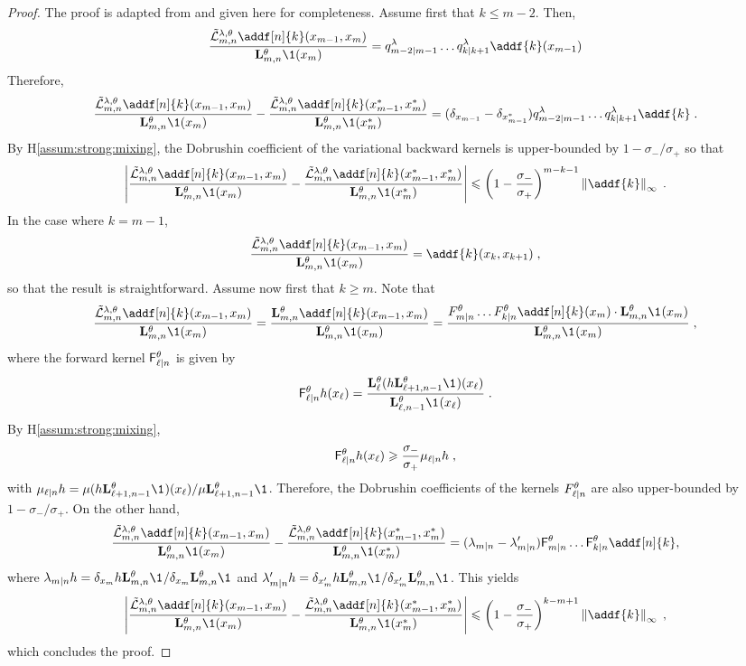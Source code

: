 \documentclass{article}
\begin{document}
\begin{proof}
The proof is adapted from  \cite[Lemma~D.3]{gloaguen2022pseudo} and given here for completeness. Assume first that $k\leq m-2$. Then,
$$
\frac{\tilde{\mathcal{L}}^{\parvar,\parvec}_{m, n}\addf[n]{k}(x_{m-1},x_m) }{\uk{m, n}{\parvec}\1(x_m)} = \vd{m-2 \vert m-1}\ldots \kvd{k \vert k+1}\addf{k}(x_{m-1})
$$
Therefore,
$$
\frac{\tilde{\mathcal{L}}^{\parvar,\parvec}_{m, n}\addf[n]{k}(x_{m-1},x_m) }{\uk{m, n}{\parvec}\1(x_m)} - \frac{\tilde{\mathcal{L}}^{\parvar,\parvec}_{m, n}\addf[n]{k}(x^*_{m-1},x^*_m) }{\uk{m, n}{\parvec}\1(x^*_m)} =  (\delta_{x_{m-1}}-\delta_{x^*_{m-1}})\vd{m-2 \vert m-1} \ldots \kvd{k \vert k+1}\addf{k}\eqsp.
$$
By H\ref{assum:strong:mixing}, the Dobrushin coefficient of the variational backward kernels is upper-bounded by $1-\sigma_-/\sigma_+$ so that 
$$
\left|\frac{\tilde{\mathcal{L}}^{\parvar,\parvec}_{m, n}\addf[n]{k}(x_{m-1},x_m) }{\uk{m, n}{\parvec}\1(x_m)} - \frac{\tilde{\mathcal{L}}^{\parvar,\parvec}_{m, n}\addf[n]{k}(x^*_{m-1},x^*_m) }{\uk{m, n}{\parvec}\1(x^*_m)} \right|\leqslant  \left(1-\frac{\sigma_-}{\sigma_+}\right)^{m-k-1}\left\|\addf{k}\right\|_\infty\eqsp.
$$
In the case where $k = m-1$, 
$$
\frac{\tilde{\mathcal{L}}^{\parvar,\parvec}_{m, n}\addf[n]{k}(x_{m-1},x_m) }{\uk{m, n}{\parvec}\1(x_m)} = \addf{k}(x_{k},x_{k+1})\eqsp,
$$
so that the result is straightforward. 
Assume now first that $k\geq m$. Note that 
$$
\frac{\tilde{\mathcal{L}}^{\parvar,\parvec}_{m, n}\addf[n]{k}(x_{m-1},x_m) }{\uk{m, n}{\parvec}\1(x_m)} = \frac{\uk{m, n}{\parvec}\addf[n]{k}(x_{m-1},x_m) }{\uk{m, n}{\parvec}\1(x_m)} = \frac{F^\parvec_{m|n}\ldots F^\parvec_{k|n}\addf[n]{k}(x_m)\cdot\uk{m, n}{\parvec}\1_{}(x_m)}{\uk{m, n}{\parvec}\1_{}(x_m)}\eqsp,
$$
where the forward kernel $ \mathsf{F}^\theta_{\ell|n}$ is given by
$$
 \mathsf{F}^\parvec_{\ell|n}h(x_\ell) = \frac{\uk{\ell}{\parvec}(h\uk{\ell+1, n-1}{\parvec}\1_{})(x_\ell)}{ \uk{\ell, n-1}{\parvec}\1_{}(x_\ell)}\eqsp.
$$
By H\ref{assum:strong:mixing},
$$
 \mathsf{F}^\theta_{\ell|n}h(x_\ell) \geqslant \frac{\sigma_-}{\sigma_+}\mu_{\ell|n}h\;,
$$
with $\mu_{\ell|n}h = \mu(h\uk{\ell+1, n-1}{\parvec}\1_{})(x_\ell) / \mu\uk{\ell+1, n-1}{\parvec}\1_{}$. Therefore, the Dobrushin coefficients of the kernels $F^\theta_{\ell|n}$  are also upper-bounded by $1-\sigma_-/\sigma_+$. On the other hand,
$$
\frac{\tilde{\mathcal{L}}^{\parvar,\parvec}_{m, n}\addf[n]{k}(x_{m-1},x_m) }{\uk{m, n}{\parvec}\1(x_m)} - \frac{\tilde{\mathcal{L}}^{\parvar,\parvec}_{m, n}\addf[n]{k}(x^*_{m-1},x^*_m) }{\uk{m, n}{\parvec}\1(x^*_m)} = (\lambda_{m|n} - \lambda'_{m|n})\mathsf{F}^\parvec_{m|n}\ldots \mathsf{F}^\parvec_{k|n}\addf[n]{k}, 
$$
where $\lambda_{m|n}h = \delta_{x_m}h\uk{m, n}{\parvec}\1_{}/\delta_{x_m}\uk{m, n}{\parvec}\1_{}$ and $\lambda'_{m|n}h = \delta_{x'_m}h\uk{m, n}{\parvec}\1_{}/\delta_{x'_m}\uk{m, n}{\parvec}\1_{}$.
This yields
$$
\left|\frac{\tilde{\mathcal{L}}^{\parvar,\parvec}_{m, n}\addf[n]{k}(x_{m-1},x_m) }{\uk{m, n}{\parvec}\1(x_m)} - \frac{\tilde{\mathcal{L}}^{\parvar,\parvec}_{m, n}\addf[n]{k}(x^*_{m-1},x^*_m) }{\uk{m, n}{\parvec}\1(x^*_m)}\right|\leqslant  \left(1-\frac{\sigma_-}{\sigma_+}\right)^{k-m+1}\left\|\addf{k}\right\|_\infty\eqsp,
$$
which concludes the proof.
 
\end{proof}
\end{document}
